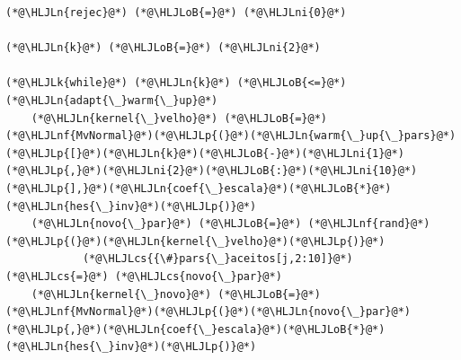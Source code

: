 \documentclass[12pt,a4paper]{article}
\newcommand{\HLJLk}[1]{\textcolor[RGB]{148,91,176}{\textbf{#1}}}
\newcommand{\HLJLn}[1]{#1}
\newcommand{\HLJLnf}[1]{\textcolor[RGB]{66,102,213}{#1}}
\newcommand{\HLJLni}[1]{\textcolor[RGB]{59,151,46}{#1}}
\newcommand{\HLJLoB}[1]{\textcolor[RGB]{102,102,102}{\textbf{#1}}}
\newcommand{\HLJLp}[1]{#1}
\newcommand{\HLJLcs}[1]{\textcolor[RGB]{153,153,119}{\textit{#1}}}
\begin{document}
\begin{lstlisting}
(*@\HLJLn{rejec}@*) (*@\HLJLoB{=}@*) (*@\HLJLni{0}@*)

(*@\HLJLn{k}@*) (*@\HLJLoB{=}@*) (*@\HLJLni{2}@*)

(*@\HLJLk{while}@*) (*@\HLJLn{k}@*) (*@\HLJLoB{<=}@*) (*@\HLJLn{adapt{\_}warm{\_}up}@*)
    (*@\HLJLn{kernel{\_}velho}@*) (*@\HLJLoB{=}@*) (*@\HLJLnf{MvNormal}@*)(*@\HLJLp{(}@*)(*@\HLJLn{warm{\_}up{\_}pars}@*)(*@\HLJLp{[}@*)(*@\HLJLn{k}@*)(*@\HLJLoB{-}@*)(*@\HLJLni{1}@*)(*@\HLJLp{,}@*)(*@\HLJLni{2}@*)(*@\HLJLoB{:}@*)(*@\HLJLni{10}@*)(*@\HLJLp{],}@*)(*@\HLJLn{coef{\_}escala}@*)(*@\HLJLoB{*}@*)(*@\HLJLn{hes{\_}inv}@*)(*@\HLJLp{)}@*)
    (*@\HLJLn{novo{\_}par}@*) (*@\HLJLoB{=}@*) (*@\HLJLnf{rand}@*)(*@\HLJLp{(}@*)(*@\HLJLn{kernel{\_}velho}@*)(*@\HLJLp{)}@*)
            (*@\HLJLcs{{\#}pars{\_}aceitos[j,2:10]}@*) (*@\HLJLcs{=}@*) (*@\HLJLcs{novo{\_}par}@*)
    (*@\HLJLn{kernel{\_}novo}@*) (*@\HLJLoB{=}@*) (*@\HLJLnf{MvNormal}@*)(*@\HLJLp{(}@*)(*@\HLJLn{novo{\_}par}@*)(*@\HLJLp{,}@*)(*@\HLJLn{coef{\_}escala}@*)(*@\HLJLoB{*}@*)(*@\HLJLn{hes{\_}inv}@*)(*@\HLJLp{)}@*)


\end{lstlisting}
\end{document}
